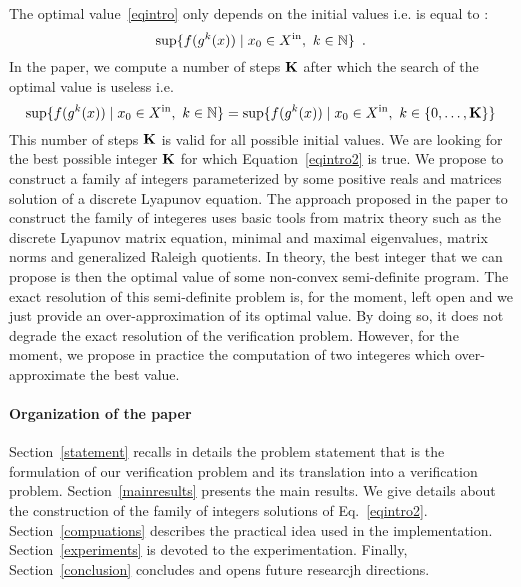 \documentclass[10pt]{article}
\begin{document}
The optimal value~\eqref{eqintro} only depends on the initial values i.e. is equal to :
\[
\sup\{f( g^k (x))\mid  x_0\in X^\mathrm{in},\ k\in\mathbb{N}\}\enspace.
\]
In the paper, we compute a number of steps $\mathbf{K}$ after which the search of the optimal value is useless i.e.
 \begin{equation}
\label{eqintro2}
\sup\{f( g^k (x))\mid  x_0\in X^\mathrm{in},\ k\in\mathbb{N}\}=
\sup\{f( g^k (x))\mid  x_0\in X^\mathrm{in},\ k\in \{0,\ldots,\mathbf{K}\}\}
\end{equation}
This number of steps $\mathbf{K}$ is valid for all possible initial values. We are looking for the best possible integer $\mathbf{K}$ for which 
Equation~\eqref{eqintro2} is true. We propose to construct a family af integers parameterized by some positive reals and matrices solution of a discrete Lyapunov equation. The approach proposed in the paper to construct the family of integeres uses basic tools from matrix theory such as the discrete Lyapunov matrix equation, minimal and maximal eigenvalues, matrix norms and generalized Raleigh quotients. In theory, the best integer that we can propose is then the optimal value of some non-convex semi-definite program.  
The exact resolution of this semi-definite problem is, for the moment, left open and we just provide an over-approximation of its optimal value. By doing so, it does not degrade the exact resolution of the verification problem.   However, for the moment, we propose in practice the computation of two integeres which over-approximate the best value. 
%

\paragraph{Organization of the paper}
Section~\ref{statement} recalls in details the problem statement that is the formulation of our verification problem and its translation into a verification problem. Section~\ref{mainresults} presents the main results. We give details about the construction of the family of integers solutions of Eq.~\eqref{eqintro2}. Section~\ref{compuations} describes the practical idea used in the implementation.  Section~\ref{experiments} is devoted to the experimentation. Finally, Section~\ref{conclusion} concludes and opens future researcjh directions.
\end{document}
